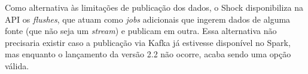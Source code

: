 

Como alternativa às limitações de publicação dos dados, o Shock disponibiliza
na API os \textit{flushes}, que atuam como \textit{jobs} adicionais que ingerem
dados de alguma fonte (que não seja um \textit{stream}) e publicam em outra.
Essa alternativa não precisaria existir caso
a publicação via Kafka já estivesse disponível no Spark, mas enquanto o
lançamento da versão 2.2 não ocorre, acaba sendo uma opção válida.
